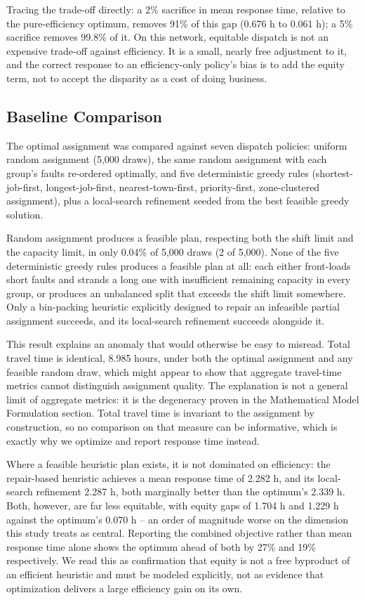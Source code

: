 \documentclass[11pt]{article}
\begin{document}
Tracing the trade-off directly: a 2\% sacrifice in mean response time, relative to the pure-efficiency optimum, removes 91\% of this gap (0.676 h to 0.061 h); a 5\% sacrifice removes 99.8\% of it. On this network, equitable dispatch is not an expensive trade-off against efficiency. It is a small, nearly free adjustment to it, and the correct response to an efficiency-only policy's bias is to add the equity term, not to accept the disparity as a cost of doing business.

\subsection*{Baseline Comparison}

The optimal assignment was compared against seven dispatch policies: uniform random assignment (5{,}000 draws), the same random assignment with each group's faults re-ordered optimally, and five deterministic greedy rules (shortest-job-first, longest-job-first, nearest-town-first, priority-first, zone-clustered assignment), plus a local-search refinement seeded from the best feasible greedy solution.

Random assignment produces a feasible plan, respecting both the shift limit and the capacity limit, in only 0.04\% of 5{,}000 draws (2 of 5{,}000). None of the five deterministic greedy rules produces a feasible plan at all: each either front-loads short faults and strands a long one with insufficient remaining capacity in every group, or produces an unbalanced split that exceeds the shift limit somewhere. Only a bin-packing heuristic explicitly designed to repair an infeasible partial assignment succeeds, and its local-search refinement succeeds alongside it.

This result explains an anomaly that would otherwise be easy to misread. Total travel time is identical, 8.985 hours, under both the optimal assignment and any feasible random draw, which might appear to show that aggregate travel-time metrics cannot distinguish assignment quality. The explanation is not a general limit of aggregate metrics: it is the degeneracy proven in the Mathematical Model Formulation section. Total travel time is invariant to the assignment by construction, so no comparison on that measure can be informative, which is exactly why we optimize and report response time instead.

Where a feasible heuristic plan exists, it is not dominated on efficiency: the repair-based heuristic achieves a mean response time of 2.282 h, and its local-search refinement 2.287 h, both marginally better than the optimum's 2.339 h. Both, however, are far less equitable, with equity gaps of 1.704 h and 1.229 h against the optimum's 0.070 h -- an order of magnitude worse on the dimension this study treats as central. Reporting the combined objective rather than mean response time alone shows the optimum ahead of both by 27\% and 19\% respectively. We read this as confirmation that equity is not a free byproduct of an efficient heuristic and must be modeled explicitly, not as evidence that optimization delivers a large efficiency gain on its own.
\end{document}
